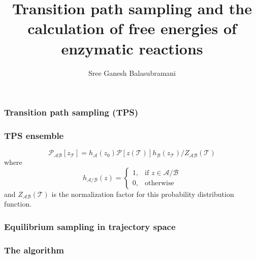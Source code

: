 \documentclass{beamer}
\title[TPS free energies]{Transition path sampling and the calculation of free energies of enzymatic reactions}
\author[Schwartz Group]{Sree Ganesh Balasubramani}
\institute[U of A]{Schwartz Group \\ Chemistry and Biochemistry \\ University of Arizona}
\date{}
\begin{document}
\begin{frame}
  \titlepage
\end{frame}
\begin{frame}
\frametitle{Transition path sampling (TPS)}
\end{frame}
\begin{frame}
\frametitle{TPS ensemble}
\begin{equation}
\mathcal{P}_{\mathcal{AB}}[z_{\mathcal{T}}] = h_{\mathcal{A}}(z_0)\mathcal{P}[z(\mathcal{T})]
h_{\mathcal{B}}(z_{\mathcal{T}})/Z_{\mathcal{AB}}(\mathcal{T})\label{eqn:tpsensem}
\end{equation}
where 
\[
    h_{\mathcal{A}/\mathcal{B}}(z)= 
\begin{cases}
    1, & \text{if } z\in \mathcal{A}/\mathcal{B}\\
    0,              & \text{otherwise}
\end{cases}
\]
and $Z_{\mathcal{AB}}(\mathcal{T})$ is the normalization factor for this 
probability distribution function.
\end{frame}
\begin{frame}
\frametitle{Equilibrium sampling in trajectory space}

\end{frame}
\begin{frame}
\frametitle{The algorithm}

\end{frame}
%
%
%
%
\end{document}
